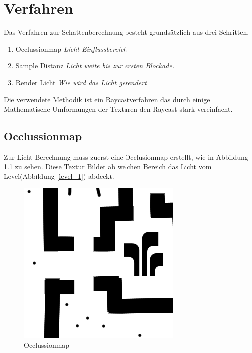 \chapter{Verfahren}
Das Verfahren zur Schattenberechnung besteht grundsätzlich aus drei Schritten.
\begin{enumerate}
	\item Occlussionmap
			\textit{Licht Einflussbereich}
	\item Sample Distanz
			\textit{Licht weite bis zur ersten Blockade.}
	\item Render Licht
			\textit{Wie wird das Licht gerendert}
\end{enumerate}
Die verwendete Methodik ist ein Raycastverfahren das durch einige Mathematische Umformungen der Texturen den Raycast stark vereinfacht.

\section{Occlussionmap}
Zur Licht Berechnung muss zuerst eine Occlusionmap erstellt, wie in Abbildung \ref{o_1} zu sehen. Diese Textur Bildet ab welchen Bereich das Licht vom Level(Abbildung \ref{level_1}) abdeckt. 
\begin{figure}[h]
	\centering
	\includegraphics{images/oclusion.png}
	\caption{Occlussionmap}
	\label{o_1}
\end{figure}
